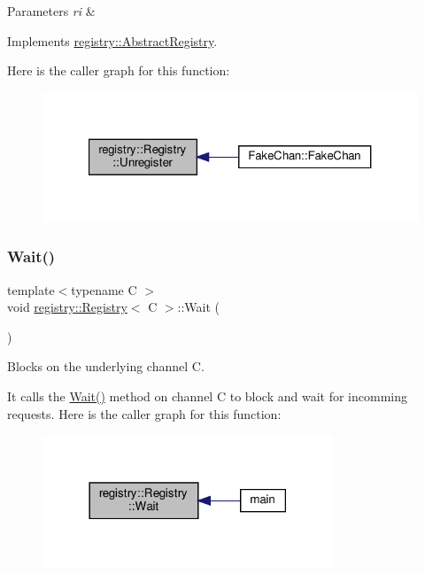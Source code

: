 \begin{DoxyParams}{Parameters}
{\em ri} & \\
\hline
\end{DoxyParams}


Implements \hyperlink{classregistry_1_1AbstractRegistry_ac5bb3b6a75a63a474f6b0afb31ea51c1}{registry\+::\+Abstract\+Registry}.

Here is the caller graph for this function\+:\nopagebreak
\begin{figure}[H]
\begin{center}
\leavevmode
\includegraphics[width=321pt]{classregistry_1_1Registry_ad020a0ef83e4a29064ad95baf2e0796f_icgraph}
\end{center}
\end{figure}
\mbox{\label{classregistry_1_1Registry_a984878071c9b250148282b2b08bf999b}} 
\subsubsection{\texorpdfstring{Wait()}{Wait()}}
{\footnotesize\ttfamily template$<$typename C $>$ \\
void \hyperlink{classregistry_1_1Registry}{registry\+::\+Registry}$<$ C $>$\+::Wait (\begin{DoxyParamCaption}{ }\end{DoxyParamCaption})}



Blocks on the underlying channel C. 

It calls the \hyperlink{classregistry_1_1Registry_a984878071c9b250148282b2b08bf999b}{Wait()} method on channel C to block and wait for incomming requests. Here is the caller graph for this function\+:\nopagebreak
\begin{figure}[H]
\begin{center}
\leavevmode
\includegraphics[width=246pt]{classregistry_1_1Registry_a984878071c9b250148282b2b08bf999b_icgraph}
\end{center}
\end{figure}


